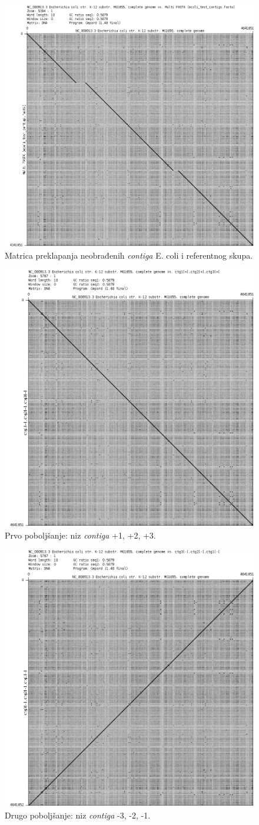 \documentclass[times, utf8, seminar, numeric]{fer}
\begin{document}
\begin{figure}[h]
	\centering
	\centerline{\includegraphics[width=0.6\linewidth]{img/ec_contigs}}
	\caption{Matrica preklapanja neobrađenih \textit{contiga} E. coli i referentnog skupa.}
	\label{fig:eccontigs}
\end{figure}

\begin{figure}[h]
	\centering
	\centerline{\includegraphics[width=0.6\linewidth]{img/ec_1_2_3}}
	\caption{Prvo poboljšanje: niz \textit{contiga} +1, +2, +3.}
	\label{fig:ec123}
\end{figure}

\begin{figure}[h]
	\centering
	\centerline{\includegraphics[width=0.6\linewidth]{img/ec_3_2_1_neg}}
	\caption{Drugo poboljšanje: niz \textit{contiga} -3, -2, -1.}
	\label{fig:ec321neg}
\end{figure}
\end{document}
